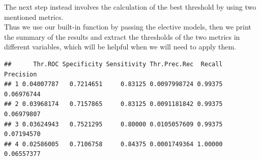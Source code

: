 \documentclass[
]{article}
\newenvironment{Shaded}{\begin{snugshade}}{\end{snugshade}}
\newcommand{\AttributeTok}[1]{\textcolor[rgb]{0.77,0.63,0.00}{#1}}
\newcommand{\ConstantTok}[1]{\textcolor[rgb]{0.00,0.00,0.00}{#1}}
\newcommand{\FunctionTok}[1]{\textcolor[rgb]{0.00,0.00,0.00}{#1}}
\newcommand{\NormalTok}[1]{#1}
\newcommand{\OtherTok}[1]{\textcolor[rgb]{0.56,0.35,0.01}{#1}}
\newcommand{\SpecialCharTok}[1]{\textcolor[rgb]{0.00,0.00,0.00}{#1}}
\begin{document}
The next step instead involves the calculation of the best threshold by
using two mentioned metrics.\\
Thus we use our built-in function by passing the elective models, then
we print the summary of the results and extract the thresholds of the
two metrics in different variables, which will be helpful when we will
need to apply them.

\begin{Shaded}
\end{Shaded}

\begin{verbatim}
##      Thr.ROC Specificity Sensitivity Thr.Prec.Rec  Recall  Precision
## 1 0.04007787   0.7214651     0.83125 0.0097998724 0.99375 0.06976744
## 2 0.03968174   0.7157865     0.83125 0.0091181842 0.99375 0.06979807
## 3 0.03624943   0.7521295     0.80000 0.0105057609 0.99375 0.07194570
## 4 0.02586005   0.7106758     0.84375 0.0001749364 1.00000 0.06557377
\end{verbatim}

\begin{Shaded}
\end{Shaded}
\end{document}

